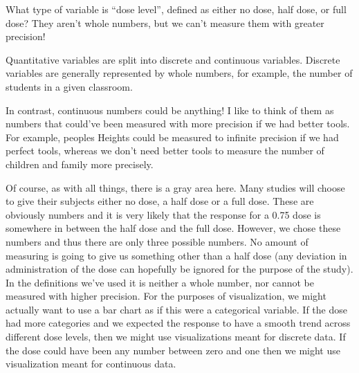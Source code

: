 \documentclass[
  letterpaper,
  DIV=11,
  numbers=noendperiod]{scrreprt}
\begin{document}
\pspace

\begin{tcolorbox}[enhanced jigsaw, opacitybacktitle=0.6, left=2mm, colbacktitle=quarto-callout-warning-color!10!white, colframe=quarto-callout-warning-color-frame, breakable, toptitle=1mm, title=\textcolor{quarto-callout-warning-color}{\faExclamationTriangle}\hspace{0.5em}{Grey Area}, opacityback=0, bottomrule=.15mm, toprule=.15mm, arc=.35mm, leftrule=.75mm, titlerule=0mm, bottomtitle=1mm, colback=white, rightrule=.15mm, coltitle=black]

What type of variable is ``dose level'', defined as either no dose, half
dose, or full dose? They aren't whole numbers, but we can't measure them
with greater precision!

\end{tcolorbox}

Quantitative variables are split into discrete and continuous variables.
Discrete variables are generally represented by whole numbers, for
example, the number of students in a given classroom.

In contrast, continuous numbers could be anything! I like to think of
them as numbers that could've been measured with more precision if we
had better tools. For example, peoples Heights could be measured to
infinite precision if we had perfect tools, whereas we don't need better
tools to measure the number of children and family more precisely.

Of course, as with all things, there is a gray area here. Many studies
will choose to give their subjects either no dose, a half dose or a full
dose. These are obviously numbers and it is very likely that the
response for a 0.75 dose is somewhere in between the half dose and the
full dose. However, we chose these numbers and thus there are only three
possible numbers. No amount of measuring is going to give us something
other than a half dose (any deviation in administration of the dose can
hopefully be ignored for the purpose of the study). In the definitions
we've used it is neither a whole number, nor cannot be measured with
higher precision. For the purposes of visualization, we might actually
want to use a bar chart as if this were a categorical variable. If the
dose had more categories and we expected the response to have a smooth
trend across different dose levels, then we might use visualizations
meant for discrete data. If the dose could have been any number between
zero and one then we might use visualization meant for continuous data.
\end{document}
